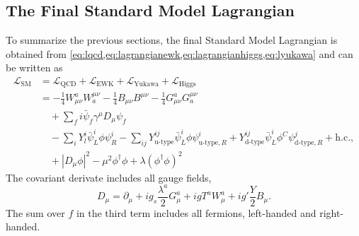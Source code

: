 \subsection{The Final Standard Model Lagrangian}
\label{subsec:final-lagrangian}
To summarize the previous sections, the final Standard Model Lagrangian is obtained from \cref{eq:lqcd,eq:lagrangianewk,eq:lagrangianhiggs,eq:lyukawa} and can be written as
\begin{align}
  \mathcal{L}_\text{SM} &= \mathcal{L}_\text{QCD} + \mathcal{L}_\text{EWK} + \mathcal{L}_\text{Yukawa} + \mathcal{L}_\text{Higgs} \\
   &= - \frac{1}{4}W_{\mu\nu}^aW^{\mu\nu}_{a} - \frac{1}{4} B_{\mu\nu}B^{\mu\nu} - \frac{1}{4}G_{\mu\nu}^aG^{\mu\nu}_{a} \\
   & \quad + \sum_f i \bar{\psi}_f\gamma^\mu D_\mu\psi_f \\
   & \quad - \sum_{i} Y_l^i \bar{\psi}^{i}_{L} \phi \psi^{i}_{R} - \sum_{ij} Y_{\text{u-type}}^{ij} \bar{\psi}^{i}_{L} \phi \psi^{i}_{\text{u-type},R} + Y_{\text{d-type}}^{ij} \bar{\psi}^{i}_{L} \phi^C \psi^{j}_{\text{d-type}, R} + \text{h.c.},  \\
   & \quad + |D_\mu\phi|^2 - \mu^2\phi^\dagger\phi + \lambda \left(\phi^\dagger\phi \right)^2
\end{align}
The covariant derivate includes all gauge fields,
\begin{equation}
  D_\mu = \partial_\mu + i g_s \frac{\lambda^a}{2} G_\mu^a + igT^aW_\mu^a + ig'\frac{Y}{2}B_\mu.
\end{equation}
The sum over $f$ in the third term includes all fermions, left-handed and right-handed.



